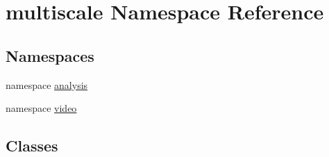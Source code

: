 \hypertarget{namespacemultiscale}{\section{multiscale Namespace Reference}
\label{namespacemultiscale}
}
\subsection*{Namespaces}
\begin{DoxyCompactItemize}
\item 
namespace \hyperlink{namespacemultiscale_1_1analysis}{analysis}
\item 
namespace \hyperlink{namespacemultiscale_1_1video}{video}
\end{DoxyCompactItemize}
\subsection*{Classes}
